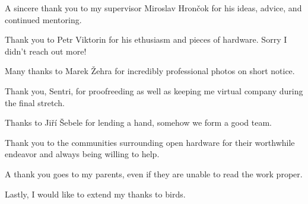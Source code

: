 A sincere thank you to my supervisor Miroslav Hrončok for his ideas, advice, and continued mentoring.

Thank you to Petr Viktorin for his ethusiasm and pieces of hardware.  Sorry I didn't reach out more!

Many thanks to Marek Žehra for incredibly professional photos on short notice.

Thank you, Sentri, for proofreeding as well as keeping me virtual company during the final stretch.

Thanks to Jiří Šebele for lending a hand, somehow we form a good team.

Thank you to the communities surrounding open hardware for their worthwhile endeavor and always being willing to help.

A thank you goes to my parents, even if they are unable to read the work proper.

Lastly, I would like to extend my thanks to birds.

